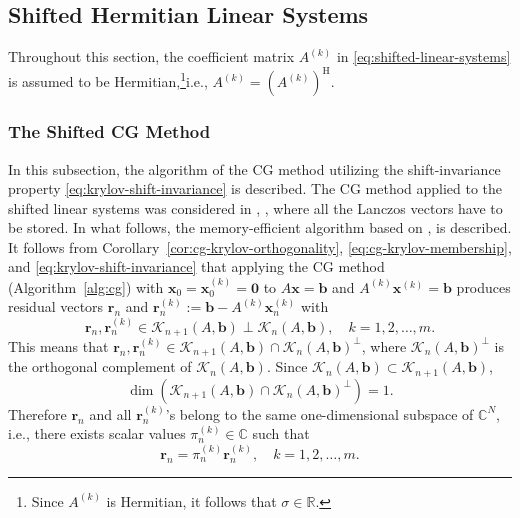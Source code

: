 \subsection{{Shifted Hermitian Linear Systems}}\label{sec:shifted-hermitian-systems}
{Throughout this section, the coefficient matrix $A^{(k)}$ in \eqref{eq:shifted-linear-systems} is assumed to be Hermitian,}\footnote{{Since $A^{(k)}$ is Hermitian, it follows that $\sigma\in\mathbb R$.}}{i.e., $A^{(k)}=(A^{(k)})^{\mathrm H}$.}
\subsubsection{{The Shifted CG Method}}\label{subsec:shifted-cg}
{In this subsection, the algorithm of the CG method utilizing the shift-invariance property \eqref{eq:krylov-shift-invariance} is described. The CG method applied to the shifted linear systems was considered in , , where all the Lanczos vectors have to be stored. In what follows, the memory-efficient algorithm based on ,  is described.}
{It follows from Corollary\ \ref{cor:cg-krylov-orthogonality}, \eqref{eq:cg-krylov-membership}, and \eqref{eq:krylov-shift-invariance} that applying the CG method (Algorithm\ \ref{alg:cg}) with $\bm x_0=\bm x_0^{(k)}=\bm0$ to $A\bm x=\bm b$ and $A^{(k)}\bm x^{(k)}=\bm b$ produces residual vectors $\bm r_n$ and $\bm r_n^{(k)}:=\bm b-A^{(k)}\bm x_n^{(k)}$ with}
\[\bm r_n,\bm r_n^{(k)}\in\mathcal K_{n+1}(A,\bm b)\perp\mathcal K_n(A,\bm b),\quad k=1,2,\ldots,m.\]
{This means that $\bm r_n,\bm r_n^{(k)}\in\mathcal K_{n+1}(A,\bm b)\cap\mathcal K_n(A,\bm b)^{\perp}$, where $\mathcal K_n(A,\bm b)^{\perp}$ is the orthogonal complement of $\mathcal K_n(A,\bm b)$. Since $\mathcal K_n(A,\bm b)\subset\mathcal K_{n+1}(A,\bm b)$,}
\begin{equation}\label{eq:shifted-cg-one-dimensional-intersection}\dim(\mathcal K_{n+1}(A,\bm b)\cap\mathcal K_n(A,\bm b)^{\perp})=1.\end{equation}
{Therefore $\bm r_n$ and all $\bm r_n^{(k)}$'s belong to the same one-dimensional subspace of $\mathbb C^N$, i.e., there exists scalar values $\pi_n^{(k)}\in\mathbb C$ such that}
\begin{equation}\label{eq:shifted-cg-residual-collinearity}\bm r_n=\pi_n^{(k)}\bm r_n^{(k)},\quad k=1,2,\ldots,m.\end{equation}
